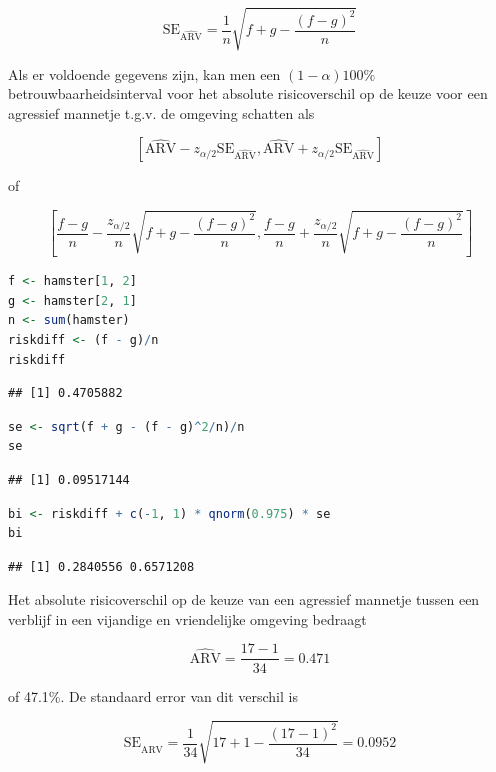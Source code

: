 \documentclass[
  12pt,dutch,coursenotes]{book}
\begin{document}
\begin{equation*}
\text{SE}_{\widehat{\text{ARV}}}=\frac{1}{n}\sqrt{f+g-\frac{(f-g)^2}{n}}
\end{equation*}

Als er voldoende gegevens zijn, kan men een \((1-\alpha)100\%\)
betrouwbaarheidsinterval voor het absolute risicoverschil op de keuze voor een agressief mannetje t.g.v. de omgeving schatten
als

\[\left[\widehat{\text{ARV}}-z_{\alpha/2}\text{SE}_{\widehat{\text{ARV}}},\widehat{\text{ARV}}+z_{\alpha/2}\text{SE}_{\widehat{\text{ARV}}}\right]\]

of

\[\left[\frac{f-g}{n}-\frac{z_{\alpha/2}}{n}\sqrt{f+g-\frac{(f-g)^2}{n}},\frac{f-g}{n}+\frac{z_{\alpha/2}}{n}\sqrt{f+g-\frac{(f-g)^2}{n}}\right] \]

\begin{lstlisting}[language=R]
f <- hamster[1, 2]
g <- hamster[2, 1]
n <- sum(hamster)
riskdiff <- (f - g)/n
riskdiff
\end{lstlisting}

\begin{lstlisting}
## [1] 0.4705882
\end{lstlisting}

\begin{lstlisting}[language=R]
se <- sqrt(f + g - (f - g)^2/n)/n
se
\end{lstlisting}

\begin{lstlisting}
## [1] 0.09517144
\end{lstlisting}

\begin{lstlisting}[language=R]
bi <- riskdiff + c(-1, 1) * qnorm(0.975) * se
bi
\end{lstlisting}

\begin{lstlisting}
## [1] 0.2840556 0.6571208
\end{lstlisting}

Het absolute risicoverschil op de keuze van een agressief mannetje tussen een verblijf in een vijandige en vriendelijke omgeving bedraagt

\begin{equation*}
\widehat{\text{ARV}}=\frac{17-1}{34}=0.471
\end{equation*}

of 47.1\%. De standaard error van dit verschil is

\begin{equation*}
\text{SE}_{\widehat{\text{ARV}}}=\frac{1}{34}\sqrt{17+1-\frac{(17-1)^2}{34}}=0.0952
\end{equation*}
\end{document}
